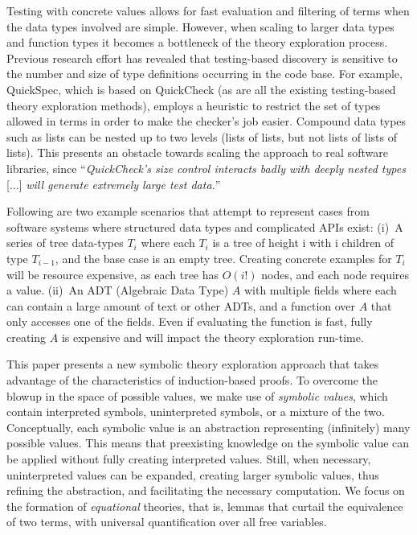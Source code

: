 Testing with concrete values allows for fast evaluation and filtering of terms when the data types involved are simple.
However, when scaling to larger data types and function types it becomes a bottleneck of the theory exploration process.
Previous research effort has revealed that testing-based discovery is sensitive to the number and size of type definitions occurring in the code base.
For example, QuickSpec, which is based on QuickCheck (as are all the existing testing-based theory exploration methods), employs a heuristic to restrict the set of types allowed in terms in order to make the checker's job easier.
Compound data types such as lists can be nested up to two levels (lists of lists, but not lists of lists of lists).
This presents an obstacle towards scaling the approach to real software libraries, since ``\textit{QuickCheck's size control
interacts badly with deeply nested types} [...] \textit{will generate extremely large test data.}''~\cite{JFP2017:Smallbonequickspec2}

Following are two example scenarios that attempt to represent cases from software systems where structured data types and complicated APIs exist:
(i)~A series of tree data-types $T_i$ where each $T_i$ is a tree of height i with i children of type $T_{i-1}$, and the base case is an empty tree.
Creating concrete examples for $T_i$ will be resource expensive, as each tree has $O(i!)$ nodes, and each node requires a value.
(ii)~An ADT (Algebraic Data Type) $A$ with multiple fields where each can contain a large amount of text or other ADTs, and a function over $A$ that only accesses one of the fields.
Even if evaluating the function is fast, fully creating $A$ is expensive and will impact the theory exploration run-time.

This paper presents a new symbolic theory exploration approach that takes advantage of the characteristics of induction-based proofs.
To overcome the blowup in the space of possible values, we make use of \emph{symbolic values}, which contain interpreted symbols, uninterpreted symbols, or a mixture of the two. 
Conceptually, each symbolic value is an abstraction representing (infinitely) many possible values. 
This means that preexisting knowledge on the symbolic value can be applied without fully creating interpreted values.
Still, when necessary, uninterpreted values can be expanded, creating larger symbolic values, thus refining the abstraction, and facilitating the necessary computation.
We focus on the formation of \emph{equational} theories, that is, lemmas that curtail the equivalence of two terms, with universal quantification over all free variables.

